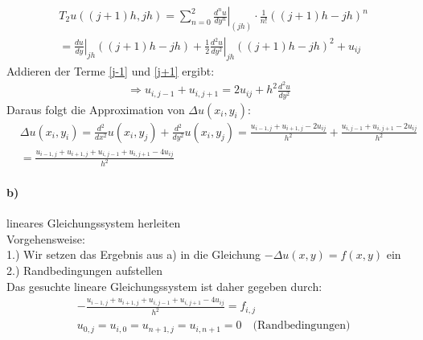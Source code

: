 \begin{align}
&T_2 u((j+1)h, jh)=\sum_{n=0}^2 \left. \frac{d^n u}{dy^n} \right|_{(jh)} \cdot \frac{1}{n!}((j+1)h-jh)^n\\ &=\left.\frac{du}{dy}\right |_{jh} ((j+1)h-jh)+\left.\frac{1}{2}\frac{d^2u}{dy^2}\right|_{jh}((j+1)h-jh)^2+u_{ij}\label{j+1}
\end{align}
Addieren der Terme \eqref{j-1} und \eqref{j+1} ergibt:
\begin{align*}
\Rightarrow u_{i, j-1}+u_{i, j+1}=2u_{ij} + h^2 \frac{d^2u}{dy^2}
\end{align*}
Daraus folgt die Approximation von $\Delta u(x_i,y_i)$:
\begin{align*}
&\Delta u(x_i, y_i)=\frac{d^2}{dx^2}u(x_i,y_j)+\frac{d^2}{dy^2}u(x_i,y_j)=\frac{u_{i-1,j}+u_{i+1,j}-2u_{ij}}{h^2}+\frac{u_{i, j-1}+u_{i, j+1}-2u_{ij}}{h^2}\\
&=\frac{u_{i-1,j}+u_{i+1,j}+u_{i, j-1}+u_{i, j+1}-4u_{ij}}{h^2}
\end{align*}
\paragraph*{b)}
lineares Gleichungssystem herleiten\\
\newline
Vorgehensweise:\\
1.) Wir setzen das Ergebnis aus a) in die Gleichung $-\Delta u(x,y)=f(x,y)$ ein\\
2.) Randbedingungen aufstellen\\
\newline
Das gesuchte lineare Gleichungssystem ist daher gegeben durch:
\begin{align*}
&-\frac{u_{i-1,j}+u_{i+1,j}+u_{i, j-1}+u_{i, j+1}-4u_{ij}}{h^2}=f_{i,j}\\
&u_{0,j}=u_{i,0}=u_{n+1,j}=u_{i,n+1}=0 \quad\text{(Randbedingungen)}
\end{align*}

